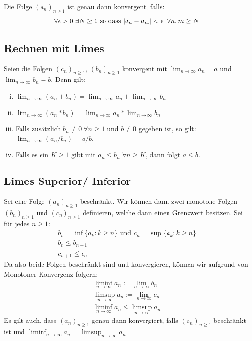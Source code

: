 \documentclass[8pt]{extarticle}
\begin{document}
\begin{multicols*}{3}
Die Folge $(a_n)_{n \geq 1}$ ist genau dann konvergent, falls:
$$
  \forall \epsilon > 0 \; \exists N \geq 1 \text{ so dass } |a_n - a_m| < \epsilon \; \; \forall n, m \geq N\\
$$

  \subsection {Rechnen mit Limes}

Seien die Folgen $(a_n)_{n \geq 1}$, $(b_n)_{n \geq 1}$ konvergent mit
$\lim_{n \rightarrow \infty} a_n = a$ und $\lim_{n \rightarrow \infty} b_n = b$.
Dann gilt:
\begin{enumerate}[(i)]
  \item $\lim_{n \rightarrow \infty} (a_n + b_n) = \lim_{n \rightarrow \infty} a_n + \lim_{n \rightarrow \infty} b_n$
  \item $\lim_{n \rightarrow \infty} (a_n * b_n) = \lim_{n \rightarrow \infty} a_n * \lim_{n \rightarrow \infty} b_n$
  \item Falls zusätzlich $b_n \neq 0 \; \forall n \geq 1$ und $b \neq 0$ gegeben ist, so gilt: $\lim_{n \rightarrow \infty} (a_n / b_n) = a / b$.
  \item Falls es ein $K \geq 1$ gibt mit $a_n \leq b_n \; \forall n \geq K$, dann folgt $a \leq b$.
\end{enumerate}
  \subsection{Limes Superior/ Inferior}
Sei eine Folge $(a_n)_{n \geq 1}$ beschränkt. Wir können dann zwei monotone
Folgen $(b_n)_{n \geq 1}$ und $(c_n)_{n \geq 1}$ definieren, welche dann einen Grenzwert besitzen.
Sei für jedes $n \geq 1$:
\begin{gather*}
  b_n = \inf\{a_k : k \geq n\} \text{ und } c_n = \sup\{a_k : k \geq n\}\\
  b_n \leq b_{n + 1}\\
  c_{n + 1} \leq c_n
\end{gather*}
Da also beide Folgen beschränkt sind und konvergieren, können wir aufgrund von
Monotoner Konvergenz folgern:
\begin{gather*}
  \liminf_{n \rightarrow \infty} a_n := \lim_{n \rightarrow \infty} b_n\\
  \limsup_{n \rightarrow \infty} a_n := \lim_{n \rightarrow \infty} c_n\\
  \liminf_{n \rightarrow \infty} a_n \leq \limsup_{n \rightarrow \infty} a_n
\end{gather*}
Es gilt auch, dass $(a_n)_{n \geq 1}$ genau dann konvergiert, falls $(a_n)_{n \geq 1}$
beschränkt ist und $\liminf_{n \rightarrow \infty} a_n = \limsup_{n \rightarrow \infty} a_n$



\end{multicols*}
\end{document}
